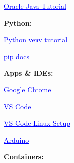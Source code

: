 \documentclass[
  english,
  paper=a4,
  oneside  ,captions=tableheading
]{scrartcl}
\begin{document}
%
  \par\vspace{0.5ex}%
  \href{https://docs.oracle.com/javase/tutorial/}{\textcolor{blue}{\underline{\faLink\quad Oracle Java Tutorial}}}%
  \par\vspace{0.5ex}%

\textbf{Python:}

%
  \par\vspace{0.5ex}%
  \href{https://docs.python.org/3/tutorial/venv.html}{\textcolor{blue}{\underline{\faLink\quad Python venv tutorial}}}%
  \par\vspace{0.5ex}%

%
  \par\vspace{0.5ex}%
  \href{https://pip.pypa.io/en/stable/}{\textcolor{blue}{\underline{\faLink\quad pip docs}}}%
  \par\vspace{0.5ex}%

\textbf{Apps \& IDEs:}

%
  \par\vspace{0.5ex}%
  \href{https://www.google.com/chrome/}{\textcolor{blue}{\underline{\faLink\quad Google Chrome}}}%
  \par\vspace{0.5ex}%

%
  \par\vspace{0.5ex}%
  \href{https://code.visualstudio.com/}{\textcolor{blue}{\underline{\faLink\quad VS Code}}}%
  \par\vspace{0.5ex}%

%
  \par\vspace{0.5ex}%
  \href{https://code.visualstudio.com/docs/setup/linux}{\textcolor{blue}{\underline{\faLink\quad VS Code Linux Setup}}}%
  \par\vspace{0.5ex}%

%
  \par\vspace{0.5ex}%
  \href{https://docs.arduino.cc/}{\textcolor{blue}{\underline{\faLink\quad Arduino}}}%
  \par\vspace{0.5ex}%

\textbf{Containers:}
\end{document}
